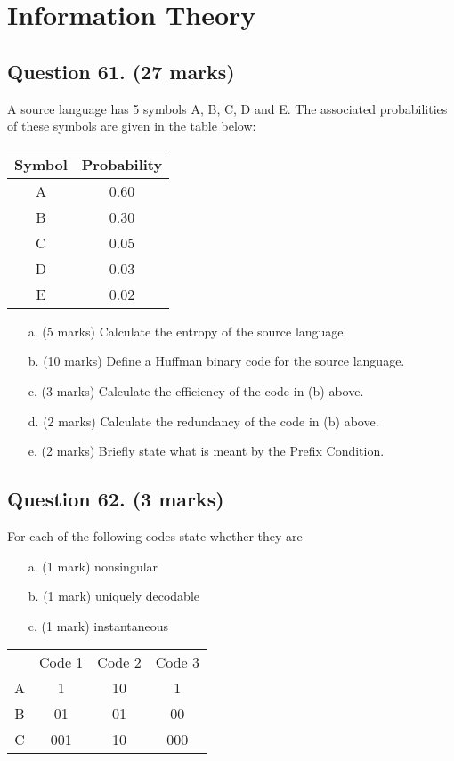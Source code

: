

\section{Information Theory}

\subsection*{Question 61. (27 marks) }
A source language has 5 symbols A, B, C, D and E. The associated
probabilities of these symbols are given in the table below:
\begin{center}
	\begin{tabular}{|c|c|}
		\hline
		Symbol & Probability \\ \hline
		A & 0.60 \\
		B & 0.30 \\
		C & 0.05 \\
		D & 0.03 \\
		E & 0.02 \\
		\hline
	\end{tabular}
\end{center}

\begin{itemize}
	\item[a.](5 marks) Calculate the entropy of the source language.
	\item[b.](10 marks) Define a Huffman binary code for the source language.
	\item[c.](3 marks) Calculate the efficiency of the code in (b) above.
	\item[d.](2 marks) Calculate the redundancy of the code in (b) above.
	\item[e.](2 marks) Briefly state what is meant by the Prefix Condition.
\end{itemize}

\subsection*{Question 62. (3 marks) } For each of the following codes state whether they are
\begin{itemize}
	\item[a.] (1 mark) nonsingular
	\item[b.] (1 mark) uniquely decodable
	\item[c.] (1 mark) instantaneous
\end{itemize}
\begin{center}
	\begin{tabular}{|c|c|c|c|}
		\hline
		& Code 1 & Code 2 & Code 3 \\
		A & 1 & 10 & 1 \\
		B & 01 & 01 & 00 \\
		C & 001 & 10 & 000 \\
		\hline
	\end{tabular}
\end{center}

